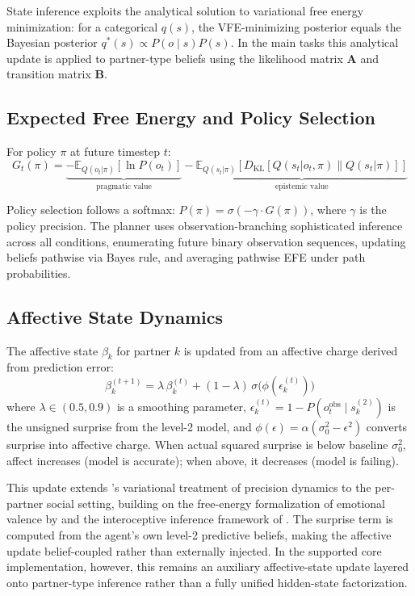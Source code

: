 \documentclass[11pt,a4paper]{article}
\begin{document}
State inference exploits the analytical solution to variational free energy minimization: for a categorical $q(s)$, the VFE-minimizing posterior equals the Bayesian posterior $q^*(s) \propto P(o \mid s) P(s)$. In the main tasks this analytical update is applied to partner-type beliefs using the likelihood matrix $\mathbf{A}$ and transition matrix $\mathbf{B}$.

\subsection{Expected Free Energy and Policy Selection}

For policy $\pi$ at future timestep $t$:
\begin{equation}
  G_t(\pi) = \underbrace{-\mathbb{E}_{Q(o_t|\pi)}[\ln P(o_t)]}_{\text{pragmatic value}} - \underbrace{\mathbb{E}_{Q(s_t|\pi)}[D_\text{KL}[Q(s_t|o_t,\pi) \| Q(s_t|\pi)]]}_{\text{epistemic value}}
\end{equation}

Policy selection follows a softmax: $P(\pi) = \sigma(-\gamma \cdot G(\pi))$, where $\gamma$ is the policy precision. The planner uses observation-branching sophisticated inference across all conditions, enumerating future binary observation sequences, updating beliefs pathwise via Bayes rule, and averaging pathwise EFE under path probabilities.

\subsection{Affective State Dynamics}

The affective state $\beta_k$ for partner $k$ is updated from an affective charge derived from prediction error:
\begin{equation}
  \beta_k^{(t+1)} = \lambda\, \beta_k^{(t)} + (1 - \lambda)\, \sigma\!\bigl(\phi(\epsilon_k^{(t)})\bigr)
\label{eq:beta_update}
\end{equation}
where $\lambda \in (0.5, 0.9)$ is a smoothing parameter, $\epsilon_k^{(t)} = 1 - P(o_t^{\mathrm{obs}} \mid s_k^{(2)})$ is the unsigned surprise from the level-2 model, and $\phi(\epsilon) = \alpha(\sigma_0^2 - \epsilon^2)$ converts surprise into affective charge. When actual squared surprise is below baseline $\sigma_0^2$, affect increases (model is accurate); when above, it decreases (model is failing).

This update extends \citeauthor{hesp2021deeply}'s variational treatment of precision dynamics to the per-partner social setting, building on the free-energy formalization of emotional valence by \citet{joffily2013emotional} and the interoceptive inference framework of \citet{seth2013interoceptive}. The surprise term is computed from the agent's own level-2 predictive beliefs, making the affective update belief-coupled rather than externally injected. In the supported core implementation, however, this remains an auxiliary affective-state update layered onto partner-type inference rather than a fully unified hidden-state factorization.
\end{document}
